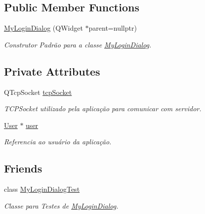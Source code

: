 \subsection*{Public Member Functions}
\begin{DoxyCompactItemize}
\item 
\hyperlink{classMyLoginDialog_ae20170dfe9e23fc1b794d3b5a2d2cc97}{My\+Login\+Dialog} (Q\+Widget $\ast$parent=nullptr)
\begin{DoxyCompactList}\small\item\em Construtor Padrão para a classe \hyperlink{classMyLoginDialog}{My\+Login\+Dialog}. \end{DoxyCompactList}\end{DoxyCompactItemize}
\subsection*{Private Attributes}
\begin{DoxyCompactItemize}
\item 
Q\+Tcp\+Socket \hyperlink{classMyLoginDialog_aea07f561f3a3e17b6596da377a538e4f}{tcp\+Socket}\hypertarget{classMyLoginDialog_aea07f561f3a3e17b6596da377a538e4f}{}\label{classMyLoginDialog_aea07f561f3a3e17b6596da377a538e4f}

\begin{DoxyCompactList}\small\item\em T\+C\+P\+Socket utilizado pela aplicação para comunicar com servidor. \end{DoxyCompactList}\item 
\hyperlink{classUser}{User} $\ast$ \hyperlink{classMyLoginDialog_a0827b7a88e7c312902a07cc17b0c9887}{user}\hypertarget{classMyLoginDialog_a0827b7a88e7c312902a07cc17b0c9887}{}\label{classMyLoginDialog_a0827b7a88e7c312902a07cc17b0c9887}

\begin{DoxyCompactList}\small\item\em Referencia ao usuário da aplicação. \end{DoxyCompactList}\end{DoxyCompactItemize}
\subsection*{Friends}
\begin{DoxyCompactItemize}
\item 
class \hyperlink{classMyLoginDialog_aec613ce0d143a48322f72a2b90819fcb}{My\+Login\+Dialog\+Test}\hypertarget{classMyLoginDialog_aec613ce0d143a48322f72a2b90819fcb}{}\label{classMyLoginDialog_aec613ce0d143a48322f72a2b90819fcb}

\begin{DoxyCompactList}\small\item\em Classe para Testes de \hyperlink{classMyLoginDialog}{My\+Login\+Dialog}. \end{DoxyCompactList}\end{DoxyCompactItemize}


